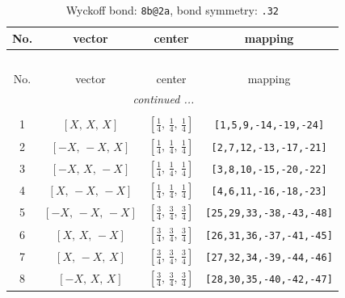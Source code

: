 \documentclass[fleqn,8pt]{jsarticle}
\begin{document}
\begin{longtable}{cccc}
\caption{Wyckoff bond: {\tt 8b@2a}, bond symmetry: {\tt .32}}
 \\
 \hline \hline
No. & vector & center & mapping \\ \hline \endfirsthead

\multicolumn{3}{l}{\tablename\ \thetable{}} \\
 \hline \hline
No. & vector & center & mapping \\ \hline \endhead

 \hline \hline
\multicolumn{3}{r}{\footnotesize\it continued ...} \\ \endfoot

 \hline \hline
\multicolumn{3}{r}{} \\ \endlastfoot

1 & $\left[ X,\, X,\, X \right]$ & $\left[ \frac{1}{4},\, \frac{1}{4},\, \frac{1}{4} \right]$ & {\tt [1,5,9,-14,-19,-24]} \\ \hline
2 & $\left[ - X,\, - X,\, X \right]$ & $\left[ \frac{1}{4},\, \frac{1}{4},\, \frac{1}{4} \right]$ & {\tt [2,7,12,-13,-17,-21]} \\ \hline
3 & $\left[ - X,\, X,\, - X \right]$ & $\left[ \frac{1}{4},\, \frac{1}{4},\, \frac{1}{4} \right]$ & {\tt [3,8,10,-15,-20,-22]} \\ \hline
4 & $\left[ X,\, - X,\, - X \right]$ & $\left[ \frac{1}{4},\, \frac{1}{4},\, \frac{1}{4} \right]$ & {\tt [4,6,11,-16,-18,-23]} \\ \hline
5 & $\left[ - X,\, - X,\, - X \right]$ & $\left[ \frac{3}{4},\, \frac{3}{4},\, \frac{3}{4} \right]$ & {\tt [25,29,33,-38,-43,-48]} \\ \hline
6 & $\left[ X,\, X,\, - X \right]$ & $\left[ \frac{3}{4},\, \frac{3}{4},\, \frac{3}{4} \right]$ & {\tt [26,31,36,-37,-41,-45]} \\ \hline
7 & $\left[ X,\, - X,\, X \right]$ & $\left[ \frac{3}{4},\, \frac{3}{4},\, \frac{3}{4} \right]$ & {\tt [27,32,34,-39,-44,-46]} \\ \hline
8 & $\left[ - X,\, X,\, X \right]$ & $\left[ \frac{3}{4},\, \frac{3}{4},\, \frac{3}{4} \right]$ & {\tt [28,30,35,-40,-42,-47]} \\
\end{longtable}
\renewcommand{\arraystretch}{1.2}
\end{document}
